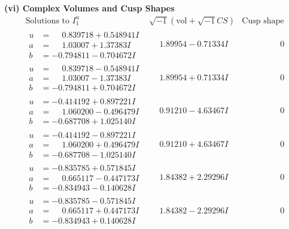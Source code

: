 \documentclass[1p]{elsarticle_modified}
\theoremstyle{definition}
\newcommand{\I}{\sqrt{-1}}
\begin{document}
\newpage\flushleft \textbf{(vi) Complex Volumes and Cusp Shapes}
$$\begin{array}{c|c|c}  
\text{Solutions to }I^u_{1}& \I (\text{vol} + \sqrt{-1}CS) & \text{Cusp shape}\\
 \hline 
\begin{aligned}
u &= \phantom{-}0.839718 + 0.548941 I \\
a &= \phantom{-}1.03007 + 1.37383 I \\
b &= -0.794811 - 0.704672 I\end{aligned}
 & \phantom{-}1.89954 - 0.71334 I & \phantom{-0.000000 } 0 \\ \hline\begin{aligned}
u &= \phantom{-}0.839718 - 0.548941 I \\
a &= \phantom{-}1.03007 - 1.37383 I \\
b &= -0.794811 + 0.704672 I\end{aligned}
 & \phantom{-}1.89954 + 0.71334 I & \phantom{-0.000000 } 0 \\ \hline\begin{aligned}
u &= -0.414192 + 0.897221 I \\
a &= \phantom{-}1.060200 - 0.496479 I \\
b &= -0.687708 + 1.025140 I\end{aligned}
 & \phantom{-}0.91210 - 4.63467 I & \phantom{-0.000000 } 0 \\ \hline\begin{aligned}
u &= -0.414192 - 0.897221 I \\
a &= \phantom{-}1.060200 + 0.496479 I \\
b &= -0.687708 - 1.025140 I\end{aligned}
 & \phantom{-}0.91210 + 4.63467 I & \phantom{-0.000000 } 0 \\ \hline\begin{aligned}
u &= -0.835785 + 0.571845 I \\
a &= \phantom{-}0.665117 - 0.447173 I \\
b &= -0.834943 - 0.140628 I\end{aligned}
 & \phantom{-}1.84382 + 2.29296 I & \phantom{-0.000000 } 0 \\ \hline\begin{aligned}
u &= -0.835785 - 0.571845 I \\
a &= \phantom{-}0.665117 + 0.447173 I \\
b &= -0.834943 + 0.140628 I\end{aligned}
 & \phantom{-}1.84382 - 2.29296 I & \phantom{-0.000000 } 0 \\ \hline\begin{aligned}

\end{aligned}
\end{array}$$
\end{document}
